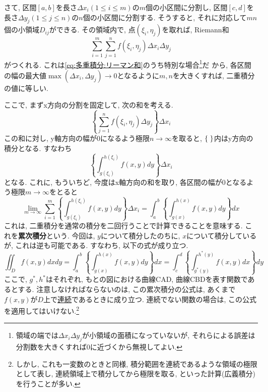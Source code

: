 \documentclass[a4j,dvipdfmx]{jsarticle}
\numberwithin{equation}{section}
\begin{document}
            さて, 区間$[a,b]$を長さ$\Delta x_i(1\leq i\leq m)$の$m$個の小区間に分割し, 区間$[c,d]$を長さ$\Delta y_j(1\leq j\leq n)$の$n$個の小区間に分割する. 
            そうすると, それに対応して$mn$個の小領域$D_{ij}$ができる. その領域内で, 点$(\xi_i,\eta_j)$を取れば, Riemann和
            \begin{equation}
                \sum_{i=1}^{m}\sum_{j=1}^{n}f(\xi_i,\eta_j)\Delta x_i\Delta y_j
            \end{equation}
            がつくれる. これは\eqref{eq:多重積分:リーマン和}のうち特別な場合\footnote{領域の端では$\Delta x_i\Delta y_j$が小領域の面積になっていないが, それらによる誤差は分割数を大きくすれば0に近づくから無視してよい.}だ
            から, 各区間の幅の最大値$\max(\Delta x_i,\Delta y_j)\to0$となるように$m,n$を大きくすれば, 二重積分の値に等しい.
            
            ここで, まずx方向の分割を固定して, 次の和を考える.
            \begin{equation}
                \left\{\sum_{j=1}^{n}f(\xi_i,\eta_j)\Delta y_j\right\}\Delta x_i
            \end{equation}
            この和に対し, y軸方向の幅が0になるよう極限$n\to\infty$を取ると, $\{\hspace{1mm}\}$内はy方向の積分となる. すなわち
            \begin{equation}
                \left\{\int_{g(\xi_i)}^{h(\xi_i)}f(x,y)dy\right\}\Delta x_i
            \end{equation}
            となる. これに, もういちど, 今度はx軸方向の和を取り, 各区間の幅が0となるよう極限$m\to\infty$をとると
            \begin{equation}
                \lim_{m\to\infty}\sum_{i=1}^{m}\left\{\int_{g(\xi_i)}^{h(\xi_i)}f(x,y)dy\right\}\Delta x_i=\int_{a}^{b}\left\{\int_{g(x)}^{h(x)}f(x,y)dy\right\}dx
            \end{equation}
            これは, 二重積分を通常の積分を二回行うことで計算できることを意味する. これを\textbf{累次積分}という.
            今回は, $y$について積分したのちに, $x$について積分しているが, これは逆も可能である. すなわち, 以下の式が成り立つ.
            \begin{equation}
                \iint_D f(x,y)dxdy = \int_{a}^{b}\left\{\int_{g(x)}^{h(x)}f(x,y)dy\right\}dx = \int_{c}^{d}\left\{\int_{g^*(y)}^{h^*(y)}f(x,y)dx\right\}dy \label{eq:多重積分:累次積分}
            \end{equation}
            ここで, $g^*,h^*$はそれぞれ, もとの図における曲線CAD, 曲線CBDを表す関数であるとする. 注意しなければならないのは, この累次積分の公式は, あくまで$f(x,y)$が$D$上で\underline{連続}であるときに成り立つ.
            連続でない関数の場合は, この公式を適用してはいけない.\footnote{しかし, これも一変数のときと同様, 積分範囲を連続であるような領域の極限として表し, 連続領域上で積分してから極限を取る, といった計算(広義積分)を行うことが多い. }\\
\end{document}
